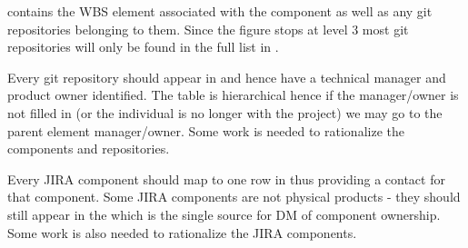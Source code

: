  contains the WBS element associated with the component as well as any git repositories belonging to them.
 Since the figure stops at level 3 most git repositories will only be found in the full list in .

 Every git repository should appear in   and hence have a technical manager and product owner identified. The table is hierarchical hence if the manager/owner is not filled in (or the individual is no longer with the project) we may go to the parent element manager/owner. Some work is needed to rationalize the components and repositories.

 Every JIRA component should map to one row in  thus providing a contact for that component.
 Some JIRA components are not physical products - they should still appear in the  which is the single source for DM of component  ownership. Some work is also needed to rationalize the JIRA components.
